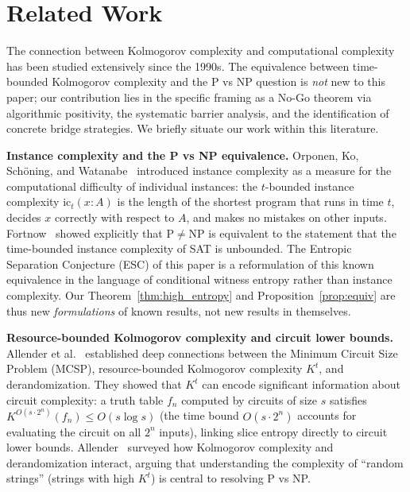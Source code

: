 \documentclass[aps,prd,twocolumn,superscriptaddress,nofootinbib]{revtex4-2}
\theoremstyle{definition}
\theoremstyle{remark}
\newcommand{\NP}{\mathrm{NP}}
\newcommand{\PP}{\mathrm{P}}
\begin{document}
\section{Related Work}
\label{sec:related}

The connection between Kolmogorov complexity and computational complexity has been studied extensively since the 1990s. The equivalence between time-bounded Kolmogorov complexity and the P vs NP question is \emph{not} new to this paper; our contribution lies in the specific framing as a No-Go theorem via algorithmic positivity, the systematic barrier analysis, and the identification of concrete bridge strategies. We briefly situate our work within this literature.

\textbf{Instance complexity and the P vs NP equivalence.}
Orponen, Ko, Schöning, and Watanabe~\cite{OrponenKoSchoeningWatanabe1994} introduced instance complexity as a measure for the computational difficulty of individual instances: the $t$-bounded instance complexity $\mathrm{ic}_t(x : A)$ is the length of the shortest program that runs in time $t$, decides $x$ correctly with respect to $A$, and makes no mistakes on other inputs. Fortnow~\cite{Fortnow2000} showed explicitly that $\PP \neq \NP$ is equivalent to the statement that the time-bounded instance complexity of SAT is unbounded. The Entropic Separation Conjecture (ESC) of this paper is a reformulation of this known equivalence in the language of conditional witness entropy rather than instance complexity. Our Theorem~\ref{thm:high_entropy} and Proposition~\ref{prop:equiv} are thus new \emph{formulations} of known results, not new results in themselves.

\textbf{Resource-bounded Kolmogorov complexity and circuit lower bounds.}
Allender et al.~\cite{Allender2006} established deep connections between the Minimum Circuit Size Problem (MCSP), resource-bounded Kolmogorov complexity $K^t$, and derandomization. They showed that $K^t$ can encode significant information about circuit complexity: a truth table $f_n$ computed by circuits of size $s$ satisfies $K^{O(s \cdot 2^n)}(f_n) \leq O(s \log s)$ (the time bound $O(s \cdot 2^n)$ accounts for evaluating the circuit on all $2^n$ inputs), linking slice entropy directly to circuit lower bounds. Allender~\cite{Allender2001} surveyed how Kolmogorov complexity and derandomization interact, arguing that understanding the complexity of ``random strings'' (strings with high $K^t$) is central to resolving P vs NP.
\end{document}
